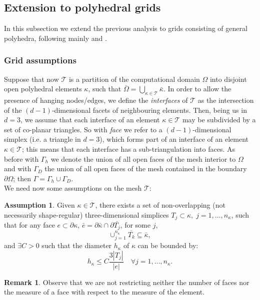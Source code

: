 \documentclass[12pt, a4paper]{article}
\theoremstyle{definition}
\newtheorem{ipotesi}{Assumption}
\theoremstyle{plain}
\theoremstyle{plain}
\theoremstyle{definition}
\newtheorem*{remark}{Remark}
\begin{document}
\subsection{Extension to polyhedral grids}\label{sec:poly}
In this subsection we extend the previous analysis to grids consisting of 
general polyhedra, following mainly \cite{multigrid} and \cite{hpmet}.
\subsubsection{Grid assumptions}
Suppose that now $\mathcal{T}$ is a partition of the computational domain 
$\Omega$ into disjoint open polyhedral elements $\kappa$, such that 
$\bar{\Omega} = \bigcup_{\kappa \in \mathcal{T}} \bar{\kappa}$. In order to 
allow the presence of hanging nodes/edges, we define the \textit{interfaces} of 
$\mathcal{T}$  as the intersection of the $(d-1)$-dimensional facets of 
neighbouring elements. Then, being us in $d=3$, we assume that each interface 
of an element $\kappa \in \mathcal{T}$ may be subdivided by a set of co-planar 
triangles. So with \textit{face} we refer to a $(d-1)$-dimensional simplex 
(i.e. a triangle in $d=3$), which forms part of an interface of an element 
$\kappa \in \mathcal{T}$; this means that each interface has a 
sub-triangulation into faces. As before with $\Gamma_h$ we denote the union of 
all open faces of the mesh interior to $\Omega$ and with $\Gamma_D$ the union 
of all open faces of the mesh contained in the boundary $\partial \Omega$; then 
$\Gamma = \Gamma_h \cup \Gamma_D$.\\
We need now some assumptions on the mesh $\mathcal{T}$:
\begin{ipotesi} \label{ipo:ipo1}
	Given $\kappa \in \mathcal{T}$, there exists a set of non-overlapping (not 
	necessarily shape-regular) three-dimensional simplices $T_j \subset \kappa, 
	\; j = 1,\dots, n_\kappa$, such that for any face $e \subset \partial 
	\kappa$, $\bar{e} = \partial \bar{\kappa} \cap \partial \bar{T_j}$, for 
	some $j$,
	\begin{equation*}
		\cup_{j = 1}^{n_\kappa} \bar{T_k} \subseteq \bar{\kappa},
	\end{equation*}
	and  $\exists C > 0$ such that the diameter $h_\kappa$ of $\kappa$ can be bounded by:
	\begin{equation*}
		h_\kappa \leq C \frac{3 |T_j|}{|e|} \quad \forall j = 1,\dots,n_\kappa.
	\end{equation*}
\end{ipotesi}
\begin{remark}
	Observe that we are not restricting neither the number of faces nor the 
	measure of a face with respect to the measure of the element.
\end{remark}
\end{document}
